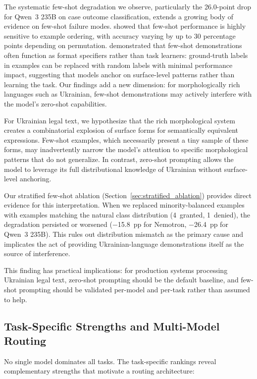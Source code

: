 \documentclass[11pt,a4paper]{article}
\begin{document}
The systematic few-shot degradation we observe, particularly the 26.0-point drop for Qwen~3 235B on case outcome classification, extends a growing body of evidence on few-shot failure modes. \citet{lu2022order} showed that few-shot performance is highly sensitive to example ordering, with accuracy varying by up to 30 percentage points depending on permutation. \citet{min2022rethinking} demonstrated that few-shot demonstrations often function as format specifiers rather than task learners: ground-truth labels in examples can be replaced with random labels with minimal performance impact, suggesting that models anchor on surface-level patterns rather than learning the task. Our findings add a new dimension: for morphologically rich languages such as Ukrainian, few-shot demonstrations may actively interfere with the model's zero-shot capabilities.

For Ukrainian legal text, we hypothesize that the rich morphological system creates a combinatorial explosion of surface forms for semantically equivalent expressions. Few-shot examples, which necessarily present a tiny sample of these forms, may inadvertently narrow the model's attention to specific morphological patterns that do not generalize. In contrast, zero-shot prompting allows the model to leverage its full distributional knowledge of Ukrainian without surface-level anchoring.

Our stratified few-shot ablation (Section~\ref{sec:stratified_ablation}) provides direct evidence for this interpretation. When we replaced minority-balanced examples with examples matching the natural class distribution (4~granted, 1~denied), the degradation persisted or worsened ($-$15.8~pp for Nemotron, $-$26.4~pp for Qwen~3 235B). This rules out distribution mismatch as the primary cause and implicates the act of providing Ukrainian-language demonstrations itself as the source of interference.

This finding has practical implications: for production systems processing Ukrainian legal text, zero-shot prompting should be the default baseline, and few-shot prompting should be validated per-model and per-task rather than assumed to help.

\subsection{Task-Specific Strengths and Multi-Model Routing}
\label{sec:routing}

No single model dominates all tasks. The task-specific rankings reveal complementary strengths that motivate a routing architecture:
\end{document}
